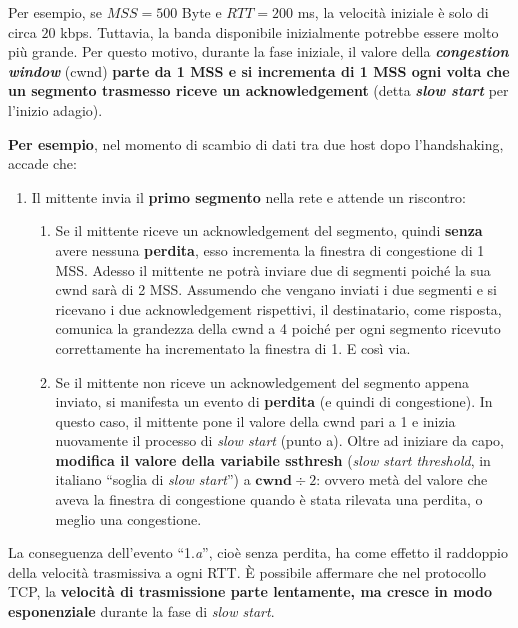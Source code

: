 \documentclass[a4paper]{article}
\newcommand{\dquotes}[1]{``#1''}
\begin{document}
	\noindent
	Per esempio, se $MSS = 500$ Byte e $RTT = 200$ ms, la velocità iniziale è solo di circa $20$ kbps. Tuttavia, la banda disponibile inizialmente potrebbe essere molto più grande. Per questo motivo, durante la fase iniziale, il valore della \textbf{\emph{congestion window}} (\textsf{cwnd}) \textbf{parte da 1 MSS e si incrementa di 1 MSS ogni volta che un segmento trasmesso riceve un acknowledgement} (detta \textcolor{Red3}{\textbf{\emph{slow start}}} per l’inizio adagio).\newline
	
	\noindent
	\textbf{Per esempio}, nel momento di scambio di dati tra due host dopo l'handshaking, accade che:
	\begin{enumerate}
		\item Il mittente invia il \textbf{primo segmento} nella rete e attende un riscontro:
		\begin{enumerate}[label=\alph*.]
			\item Se il mittente riceve un acknowledgement del segmento, quindi \textbf{senza} avere nessuna \textbf{perdita}, esso incrementa la finestra di congestione di 1 MSS.\newline
			Adesso il mittente ne potrà inviare due di segmenti poiché la sua \textsf{cwnd} sarà di 2 MSS.\newline
			Assumendo che vengano inviati i due segmenti e si ricevano i due acknowledgement rispettivi, il destinatario, come risposta, comunica la grandezza della \textsf{cwnd} a 4 poiché per ogni segmento ricevuto correttamente ha incrementato la finestra di 1.\newline
			E così via.
			
			\item Se il mittente non riceve un acknowledgement del segmento appena inviato, si manifesta un evento di \textbf{perdita} (e quindi di congestione).\newline
			In questo caso, il mittente pone il valore della \textsf{cwnd} pari a 1 e inizia nuovamente il processo di \emph{slow start} (punto a).\newline
			Oltre ad iniziare da capo, \textbf{modifica il valore della variabile \textsf{ssthresh}} (\emph{slow start threshold}, in italiano \dquotes{soglia di \emph{slow start}}) a $\textbf{cwnd} \div 2$: ovvero metà del valore che aveva la finestra di congestione quando è stata rilevata una perdita, o meglio una congestione.
		\end{enumerate}
	\end{enumerate}
	La conseguenza dell’evento \dquotes{1.\emph{a}}, cioè senza perdita, ha come effetto il raddoppio della velocità trasmissiva a ogni RTT. È possibile affermare che nel protocollo TCP, la \textbf{velocità di trasmissione parte lentamente, ma cresce in modo esponenziale} durante la fase di \emph{slow start}.\newline
	
\end{document}
